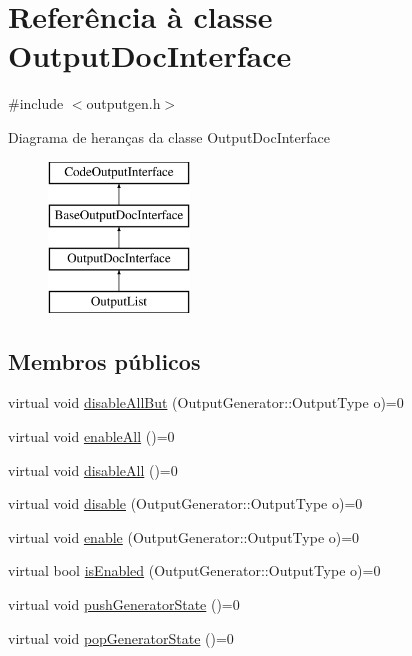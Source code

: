 \hypertarget{class_output_doc_interface}{\section{Referência à classe Output\-Doc\-Interface}
\label{class_output_doc_interface}
}


{\ttfamily \#include $<$outputgen.\-h$>$}

Diagrama de heranças da classe Output\-Doc\-Interface\begin{figure}[H]
\begin{center}
\leavevmode
\includegraphics[height=4.000000cm]{class_output_doc_interface}
\end{center}
\end{figure}
\subsection*{Membros públicos}
\begin{DoxyCompactItemize}
\item 
virtual void \hyperlink{class_output_doc_interface_ae51277470e8341fec8500f34b01ef7c4}{disable\-All\-But} (Output\-Generator\-::\-Output\-Type o)=0
\item 
virtual void \hyperlink{class_output_doc_interface_a320d024acf52e5030cbd115038dd63b4}{enable\-All} ()=0
\item 
virtual void \hyperlink{class_output_doc_interface_ad28260bd5a78968243fe123f42719d1e}{disable\-All} ()=0
\item 
virtual void \hyperlink{class_output_doc_interface_a179ce9b58cecdbe5a430c4bf741aff80}{disable} (Output\-Generator\-::\-Output\-Type o)=0
\item 
virtual void \hyperlink{class_output_doc_interface_ae04d1c59d6fbb2fa89ad44d9ef01a298}{enable} (Output\-Generator\-::\-Output\-Type o)=0
\item 
virtual bool \hyperlink{class_output_doc_interface_aab8dbaf4e1d5b4993fe18d75ce533f93}{is\-Enabled} (Output\-Generator\-::\-Output\-Type o)=0
\item 
virtual void \hyperlink{class_output_doc_interface_a0ad42fd0ab4788718130d1033012c1a6}{push\-Generator\-State} ()=0
\item 
virtual void \hyperlink{class_output_doc_interface_a7ecb0cf2cfdfd572cfd2713c750a0f12}{pop\-Generator\-State} ()=0
\end{DoxyCompactItemize}
